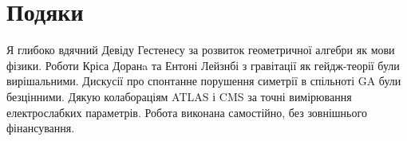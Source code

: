 \documentclass[11pt,a4paper]{article}
\theoremstyle{definition}
\theoremstyle{plain}
\theoremstyle{remark}
\begin{document}
\vspace{1em}

\section*{Подяки}

Я глибоко вдячний Девіду Гестенесу за розвиток геометричної алгебри як мови фізики. Роботи Кріса Доранa та Ентоні Лейзнбі з гравітації як гейдж-теорії були вирішальними. Дискусії про спонтанне порушення симетрії в спільноті GA були безцінними. Дякую колабораціям ATLAS і CMS за точні вимірювання електрослабких параметрів. Робота виконана самостійно, без зовнішнього фінансування.

\vspace{1em}

\end{document}

